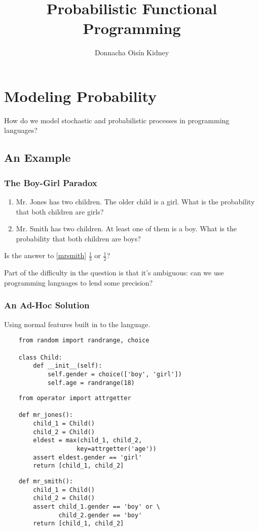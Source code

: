 \documentclass[usenames,dvipsnames]{beamer}
\title{Probabilistic Functional Programming}
\author{Donnacha Oisín Kidney}
\begin{document}
\frame{\titlepage}
\begin{frame}
  \begin{multicols}{2}
    \tableofcontents
  \end{multicols}
\end{frame}
\section{Modeling Probability}
\begin{frame}
  How do we model stochastic and probabilistic processes in programming
  languages?
\end{frame}
\subsection{An Example}
\begin{frame}
  \frametitle{The Boy-Girl Paradox}
  \begin{enumerate}
    \item Mr. Jones has two children. The older child is a girl. What is the
      probability that both children are girls?
    \item \label{mrsmith} Mr. Smith has two children. At least one of them is a
      boy. What is the probability that both children are boys?
  \end{enumerate}
  \pause
  Is the answer to \ref{mrsmith} $\frac{1}{3}$ or $\frac{1}{2}$?
  \pause

  Part of the difficulty in the question is that it's ambiguous: can we use
  programming languages to lend some precision?
\end{frame}
\begin{frame}
  \frametitle{An Ad-Hoc Solution}
  Using normal features built in to the language.
  \begin{verbatim}
    from random import randrange, choice

    class Child:
        def __init__(self):
            self.gender = choice(['boy', 'girl'])
            self.age = randrange(18)
  \end{verbatim}
  \begin{verbatim}
    from operator import attrgetter

    def mr_jones():
        child_1 = Child()
        child_2 = Child()
        eldest = max(child_1, child_2,
                    key=attrgetter('age'))
        assert eldest.gender == 'girl'
        return [child_1, child_2]
  \end{verbatim}
  \begin{verbatim}
    def mr_smith():
        child_1 = Child()
        child_2 = Child()
        assert child_1.gender == 'boy' or \
               child_2.gender == 'boy'
        return [child_1, child_2]
  \end{verbatim}
\end{frame}
\end{document}
